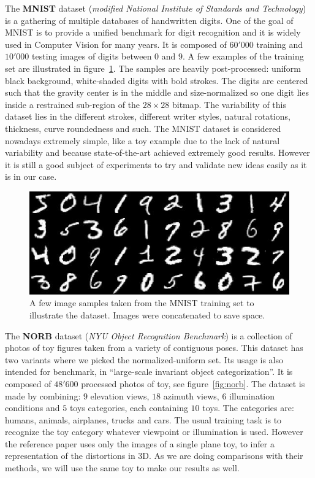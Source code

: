 \documentclass[a4paper,12pt]{report}
\begin{document}
The {\bf MNIST} dataset ({\em modified National Institute of Standards and Technology}) is a gathering of multiple databases of handwritten digits.
One of the goal of MNIST is to provide a unified benchmark for digit recognition and it is widely used in Computer Vision for many years.
It is composed of $60'000$ training and $10'000$ testing images of digits between $0$ and $9$.
A few examples of the training set are illustrated in figure~\ref{fig:mnist}.
The samples are heavily post-processed: uniform black background, white-shaded digits with bold strokes.
The digits are centered such that the gravity center is in the middle and size-normalized so one digit lies inside a restrained sub-region of the $28 \times 28$ bitmap.
The variability of this dataset lies in the different strokes, different writer styles, natural rotations, thickness, curve roundedness and such.
The MNIST dataset is considered nowadays extremely simple, like a toy example due to the lack of natural variability and because state-of-the-art achieved extremely good results.
However it is still a good subject of experiments to try and validate new ideas easily as it is in our case.

\begin{figure}[t]
    \begin{center}
        \includegraphics{thesis_figures/mnist.jpg}
    \end{center}
    \caption{A few image samples taken from the MNIST training set to illustrate the dataset. Images were concatenated to save space.}
    \label{fig:mnist}
\end{figure}

The {\bf NORB} dataset ({\em NYU Object Recognition Benchmark}) is a collection of photos of toy figures taken from a variety of contiguous poses.
This dataset has two variants where we picked the normalized-uniform set.
Its usage is also intended for benchmark, in ``large-scale invariant object categorization''.
It is composed of $48'600$ processed photos of toy, see figure~\ref{fig:norb}.
The dataset is made by combining: $9$ elevation views, $18$ azimuth views, $6$ illumination conditions and $5$ toys categories, each containing $10$ toys.
The categories are: humans, animals, airplanes, trucks and cars.
The usual training task is to recognize the toy category whatever viewpoint or illumination is used.
However the reference paper uses only the images of a single plane toy, to infer a representation of the distortions in 3D.
As we are doing comparisons with their methods, we will use the same toy to make our results as well.
\end{document}
